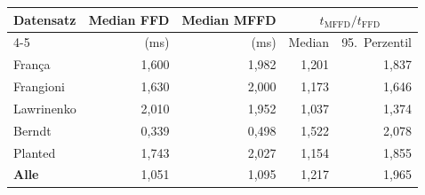 \begin{tabular}{l r r r r}
\toprule
Datensatz & Median FFD & Median MFFD & \multicolumn{2}{c}{$t_{\mathrm{MFFD}}/t_{\mathrm{FFD}}$} \\
\cmidrule(lr){4-5}
 & (ms) & (ms) & Median & 95.\ Perzentil \\
\midrule
França & 1{,}600 & 1{,}982 & 1{,}201 & 1{,}837 \\
Frangioni & 1{,}630 & 2{,}000 & 1{,}173 & 1{,}646 \\
Lawrinenko & 2{,}010 & 1{,}952 & 1{,}037 & 1{,}374 \\
Berndt & 0{,}339 & 0{,}498 & 1{,}522 & 2{,}078 \\
Planted & 1{,}743 & 2{,}027 & 1{,}154 & 1{,}855 \\
\midrule
\textbf{Alle} & 1{,}051 & 1{,}095 & 1{,}217 & 1{,}965 \\
\bottomrule
\end{tabular}
